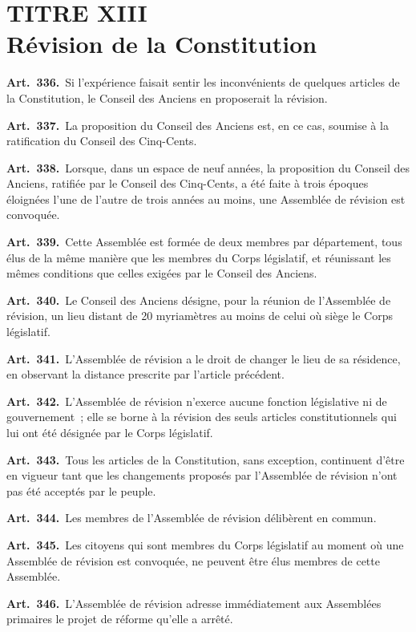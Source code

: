 \documentclass[french,twoside]{book} %
\newcommand{\labelchar}[1]{\textbf{\color{rubric} #1}}
\begin{document}
\section[{TITRE XIII. Révision de la Constitution}]{TITRE XIII \\
Révision de la Constitution}

\labelchar{Art. 336.} Si l’expérience faisait sentir les inconvénients de quelques articles de la Constitution, le Conseil des Anciens en proposerait la révision.\par
\labelchar{Art. 337.} La proposition du Conseil des Anciens est, en ce cas, soumise à la ratification du Conseil des Cinq-Cents.\par
\labelchar{Art. 338.} Lorsque, dans un espace de neuf années, la proposition du Conseil des Anciens, ratifiée par le Conseil des Cinq-Cents, a été faite à trois époques éloignées l’une de l’autre de trois années au moins, une Assemblée de révision est convoquée.\par
\labelchar{Art. 339.} Cette Assemblée est formée de deux membres par département, tous élus de la même manière que les membres du Corps législatif, et réunissant les mêmes conditions que celles exigées par le Conseil des Anciens.\par
\labelchar{Art. 340.} Le Conseil des Anciens désigne, pour la réunion de l’Assemblée de révision, un lieu distant de 20 myriamètres au moins de celui où siège le Corps législatif.\par
\labelchar{Art. 341.} L’Assemblée de révision a le droit de changer le lieu de sa résidence, en observant la distance prescrite par l’article précédent.\par
\labelchar{Art. 342.} L’Assemblée de révision n’exerce aucune fonction législative ni de gouvernement ; elle se borne à la révision des seuls articles constitutionnels qui lui ont été désignée par le Corps législatif.\par
\labelchar{Art. 343.} Tous les articles de la Constitution, sans exception, continuent d’être en vigueur tant que les changements proposés par l’Assemblée de révision n’ont pas été acceptés par le peuple.\par
\labelchar{Art. 344.} Les membres de l’Assemblée de révision délibèrent en commun.\par
\labelchar{Art. 345.} Les citoyens qui sont membres du Corps législatif au moment où une Assemblée de révision est convoquée, ne peuvent être élus membres de cette Assemblée.\par
\labelchar{Art. 346.} L’Assemblée de révision adresse immédiatement aux Assemblées primaires le projet de réforme qu’elle a arrêté.\par
\end{document}
